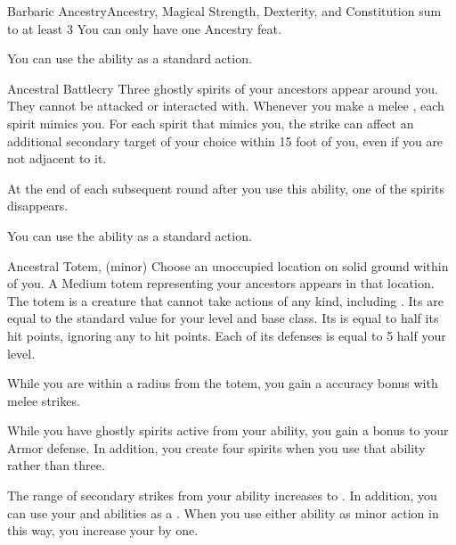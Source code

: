     \begin{magicalfeat}{Barbaric Ancestry}{Ancestry, Magical}
        \featpre Strength, Dexterity, and Constitution sum to at least 3
         You can only have one Ancestry feat.

         You can use the  ability as a standard action.
        \begin{magicalactiveability}{Ancestral Battlecry}
            Three ghostly spirits of your ancestors appear around you.
            They cannot be attacked or interacted with.
            Whenever you make a melee , each spirit mimics you.
            For each spirit that mimics you, the strike can affect an additional secondary target of your choice within 15 foot  of you, even if you are not adjacent to it.

            At the end of each subsequent round after you use this ability, one of the spirits disappears.
        \end{magicalactiveability}

         You can use the  ability as a standard action.
        \begin{magicalsustainability}{Ancestral Totem}{,  (minor)}
            Choose an unoccupied location on solid ground within \shortrange of you.
            A Medium totem representing your ancestors appears in that location.
            The totem is a creature that cannot take actions of any kind, including .
            Its  are equal to the standard value for your level and base class.
            Its  is equal to half its hit points, ignoring any  to hit points.
            Each of its defenses is equal to 5 \add half your level.

            While you are within a \medarea radius  from the totem, you gain a  accuracy bonus with melee strikes.
        \end{magicalsustainability}

         While you have ghostly spirits active from your  ability, you gain a  bonus to your Armor defense.
        In addition, you create four spirits when you use that ability rather than three.

         The range of secondary strikes from your  ability increases to \shortrange.
        In addition, you can use your  and  abilities as a .
        When you use either ability as minor action in this way, you increase your  by one.
    \end{magicalfeat}

